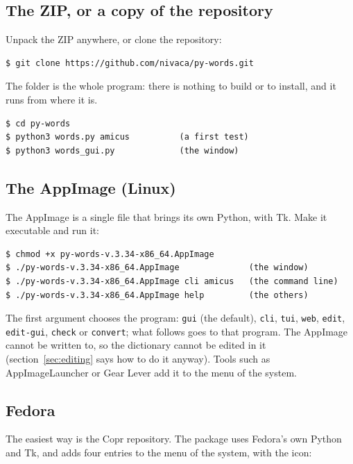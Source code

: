 \documentclass[12pt,
              article,
              oneside
              ]{memoir}
\begin{document}
\subsection{The ZIP, or a copy of the repository}

%
Unpack the ZIP anywhere, or clone the repository:

\begin{verbatim}
$ git clone https://github.com/nivaca/py-words.git
\end{verbatim}

\noindent
The folder is the whole program: there is nothing to build or to install,
and it runs from where it is.

\begin{verbatim}
$ cd py-words
$ python3 words.py amicus          (a first test)
$ python3 words_gui.py             (the window)
\end{verbatim}

\subsection{The AppImage (Linux)}

%
The AppImage is a single file that brings its own Python, with Tk. Make it
executable and run it:

\begin{verbatim}
$ chmod +x py-words-v.3.34-x86_64.AppImage
$ ./py-words-v.3.34-x86_64.AppImage              (the window)
$ ./py-words-v.3.34-x86_64.AppImage cli amicus   (the command line)
$ ./py-words-v.3.34-x86_64.AppImage help         (the others)
\end{verbatim}

\noindent{}%
The first argument chooses the program: \texttt{gui} (the default),
\texttt{cli}, \texttt{tui}, \texttt{web}, \texttt{edit},
\texttt{edit-gui}, \texttt{check} or \texttt{convert}; what follows goes to
that program. The AppImage cannot be written to, so the dictionary cannot
be edited in it (section~\ref{sec:editing} says how to do it anyway).
Tools such as AppImageLauncher or Gear Lever add it to the menu of the
system.

\subsection{Fedora}

%
The easiest way is the Copr repository. The package uses Fedora's own
Python and Tk, and adds four entries to the menu of the system, with the
icon:
\end{document}
